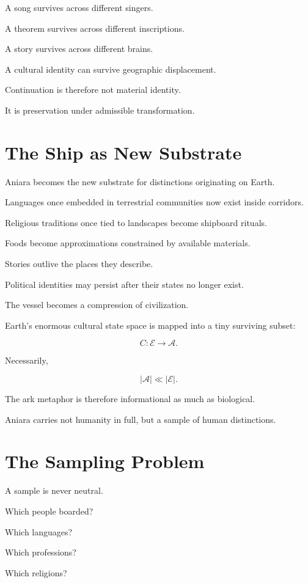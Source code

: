 \documentclass[11pt,oneside]{book}
\theoremstyle{definition}
\theoremstyle{remark}
\begin{document}
A song survives across different singers.

A theorem survives across different inscriptions.

A story survives across different brains.

A cultural identity can survive geographic displacement.

Continuation is therefore not material identity.

It is preservation under admissible transformation.

\section{The Ship as New Substrate}

Aniara becomes the new substrate for distinctions originating on Earth.

Languages once embedded in terrestrial communities now exist inside corridors.

Religious traditions once tied to landscapes become shipboard rituals.

Foods become approximations constrained by available materials.

Stories outlive the places they describe.

Political identities may persist after their states no longer exist.

The vessel becomes a compression of civilization.

Earth's enormous cultural state space is mapped into a tiny surviving subset:

\[
C:
\mathcal E
\rightarrow
\mathcal A.
\]

Necessarily,

\[
|\mathcal A|
\ll
|\mathcal E|.
\]

The ark metaphor is therefore informational as much as biological.

Aniara carries not humanity in full, but a sample of human distinctions.

\section{The Sampling Problem}

A sample is never neutral.

Which people boarded?

Which languages?

Which professions?

Which religions?
\end{document}
